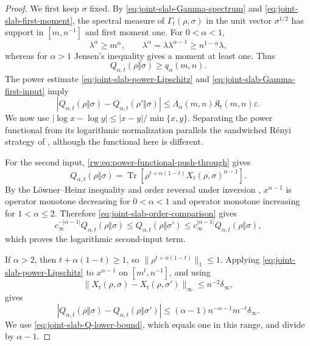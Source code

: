 \documentclass[11pt]{article}
\theoremstyle{remark}
\newcommand{\1}{\mathbbm{1}}
\begin{document}
\begin{proof}
We first keep $\sigma$ fixed.  By
\eqref{eq:joint-slab-Gamma-spectrum} and
\eqref{eq:joint-slab-first-moment}, the spectral measure of
$\Gamma_t(\rho,\sigma)$ in the unit vector $\sigma^{1/2}$ has support
in $[m,n^{-1}]$ and first moment one.  For $0<\alpha<1$,
\begin{equation}
 \lambda^\alpha\geq m^\alpha,
 \qquad
 \lambda^\alpha
 =\lambda\lambda^{\alpha-1}\geq n^{1-\alpha}\lambda,
\end{equation}
whereas for $\alpha>1$ Jensen's inequality gives a moment at least
one.  Thus
\begin{equation}
 Q_{\alpha,t}(\rho\Vert\sigma)\geq q_\alpha(m,n).
 \label{eq:joint-slab-Q-lower-bound}
\end{equation}
The power estimate \eqref{eq:joint-slab-power-Lipschitz} and
\eqref{eq:joint-slab-Gamma-first-input} imply
\begin{equation}
 \left|Q_{\alpha,t}(\rho\Vert\sigma)
       -Q_{\alpha,t}(\rho'\Vert\sigma)\right|
 \leq\Lambda_\alpha(m,n)\mathfrak K_t(m,n)\varepsilon.
 \label{eq:joint-slab-Q-first-input}
\end{equation}
We now use
$|\log x-\log y|\leq|x-y|/\min\{x,y\}$.  Separating the power
functional from its logarithmic normalization parallels the
sandwiched R\'enyi strategy of
\cite[Example~4.3 and the proof of Theorem~4.4]
{bluhm2026unified}, although the functional here is different.

For the second input, \eqref{rw:eq:power-functional-push-through}
gives
\begin{equation}
 Q_{\alpha,t}(\rho\Vert\sigma)
 =\operatorname{Tr}\!\left[
 \rho^{t+\alpha(1-t)}
 X_t(\rho,\sigma)^{\alpha-1}\right].
 \label{eq:joint-slab-Q-X-representation}
\end{equation}
By the L\"owner--Heinz inequality and order reversal under inversion
\cite[Theorem~1.5.9, p.~22]{bhatia2009positive},
$x^{\alpha-1}$ is operator monotone decreasing for $0<\alpha<1$
and operator monotone increasing for $1<\alpha\leq2$.  Therefore
\eqref{eq:joint-slab-order-comparison} gives
\begin{equation}
 c_\infty^{-|\alpha-1|}Q_{\alpha,t}(\rho\Vert\sigma)
 \leq Q_{\alpha,t}(\rho\Vert\sigma')
 \leq c_\infty^{|\alpha-1|}Q_{\alpha,t}(\rho\Vert\sigma),
 \label{eq:joint-slab-Q-order-comparison}
\end{equation}
which proves the logarithmic second-input term.

If $\alpha>2$, then $t+\alpha(1-t)\geq1$, so
$\lVert\rho^{t+\alpha(1-t)}\rVert_1\leq1$.  Applying
\eqref{eq:joint-slab-power-Lipschitz} to $x^{\alpha-1}$ on
$[m^t,n^{-1}]$, and using
\begin{equation}
 \lVert X_t(\rho,\sigma)-X_t(\rho,\sigma')\rVert_\infty
 \leq n^{-2}\delta_\infty,
\end{equation}
gives
\begin{equation}
 \left|Q_{\alpha,t}(\rho\Vert\sigma)
       -Q_{\alpha,t}(\rho\Vert\sigma')\right|
 \leq(\alpha-1)n^{-\alpha-1}m^{-t}\delta_\infty.
\end{equation}
We use \eqref{eq:joint-slab-Q-lower-bound}, which equals one in this
range, and divide by $\alpha-1$.
\end{proof}
\end{document}
